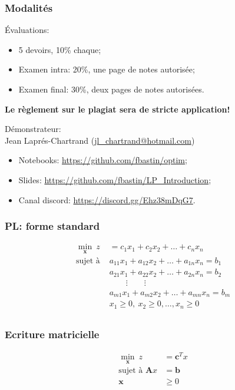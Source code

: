\documentclass[usepdftitle=false]{beamer}
\def\bb{\boldsymbol{b}}
\def\bc{\boldsymbol{c}}
\def\bx{\boldsymbol{x}}
\def\bA{\boldsymbol{A}}
\begin{document}
\begin{frame}
\frametitle{Modalités}

Évaluations:
\begin{itemize}
	\item 5 devoirs, 10\% chaque;
	\item Examen intra: 20\%, une page de notes autorisée;
	\item Examen final: 30\%, deux pages de notes autorisées.
\end{itemize}
{\bf Le règlement sur le plagiat sera de stricte application!}

\mbox{}

Démonstrateur:\\
 Jean Laprés-Chartrand (\url{jl_chartrand@hotmail.com})\\

\mbox{}

\begin{itemize}
	\item 
Notebooks: \url{https://github.com/fbastin/optim};
\item
Slides: \url{https://github.com/fbastin/LP_Introduction};
\item
Canal discord: \url{https://discord.gg/Ehz38mDqG7}.
\end{itemize}

\end{frame}

\begin{frame}
\frametitle{PL: forme standard}

\begin{align*}
\min_{\bx}\ z &= c_1x_1+c_2x_2+\ldots +c_nx_n \\
\mbox{sujet à } &
a_{11}x_1 + a_{12}x_2 + \ldots + a_{1n}x_n = b_1 \\
&a_{21}x_1 + a_{22}x_2 + \ldots + a_{2n}x_n = b_2 \\
& \qquad \vdots \qquad \vdots \\
& a_{m1}x_1 + a_{m2}x_2 + \ldots + a_{mn}x_n = b_m \\
& x_1 \geq 0,\ x_2 \geq 0, \ldots, x_n \geq 0 \\
\end{align*}

\mbox{}
\end{frame}

\begin{frame}
\frametitle{Ecriture matricielle}

\begin{align*}
\min_{\bx} \ z &= \bc^T x \\
\mbox{sujet à } \bA x &= \bb \\
\bx & \geq 0
\end{align*}

\end{frame}
\end{document}
